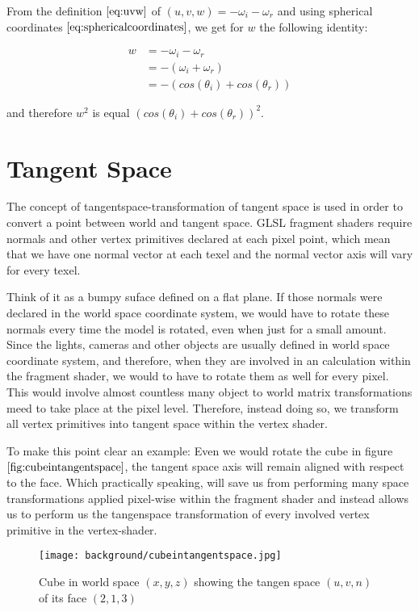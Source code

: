 \label{sec:componentw}
From the definition $\ref{eq:uvw}$ of $(u,v,w)= -\omega_i - \omega_r$ and using spherical coordinates $\ref{eq:sphericalcoordinates}$, we get for $w$ the following identity:

\begin{align}
w 
&= -\omega_i - \omega_r \nonumber \\ 
&= -(\omega_i + \omega_r) \nonumber \\
&= -\left( cos(\theta_i)+cos(\theta_r) \right) 
\label{eq:sphericalomega}
\end{align}

and therefore $w^2$ is equal $(cos(\theta_i)+cos(\theta_r))^2$. 

\section{Tangent Space}
\label{sec:tangentspace}
The concept of tangentspace-transformation of tangent space is used in order to convert a point between world and tangent space. GLSL fragment shaders require normals and other vertex primitives declared at each pixel point, which mean that we have one normal vector at each texel and the normal vector axis will vary for every texel. 

Think of it as a bumpy suface defined on a flat plane. If those normals were declared in the world space coordinate system, we would have to rotate these normals every time the model is rotated, even when just for a small amount. Since the lights, cameras and other objects are usually defined in world space coordinate system, and therefore, when they are involved in an calculation within the fragment shader, we would to have to rotate them as well for every pixel. This would involve almost countless many object to world matrix transformations meed to take place at the pixel level. Therefore, instead doing so, we transform all vertex primitives into tangent space within the vertex shader. 

To make this point clear an example: Even we would rotate the cube in figure $\ref{fig:cubeintangentspace}$, the tangent space axis will remain aligned with respect to the face. Which practically speaking, will save us from performing many space transformations applied pixel-wise within the fragment shader and instead allows us to perform us the tangenspace transformation of every involved vertex primitive in the vertex-shader.

\begin{figure}[H]
  \centering
  \texttt{[image: background/cubeintangentspace.jpg]}
  \caption[Illustration of a Tangent Space]{Cube in world space $(x,y,z)$ showing the tangen space $(u,v,n)$ of its face $(2,1,3)$}
  \label{fig:cubeintangentspace}
\end{figure}
